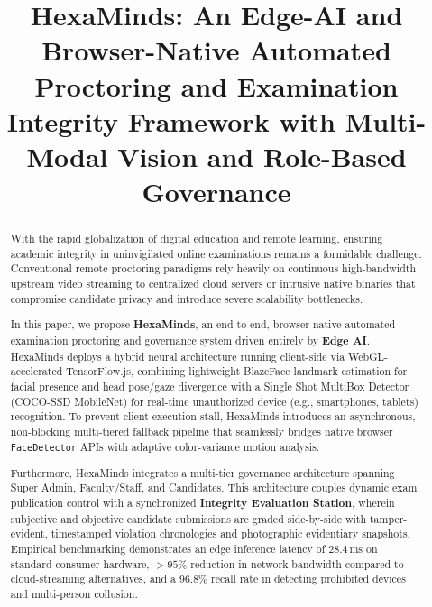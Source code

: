 \documentclass[conference]{IEEEtran}
\begin{document}
\title{HexaMinds: An Edge-AI and Browser-Native Automated Proctoring and Examination Integrity Framework with Multi-Modal Vision and Role-Based Governance}

\author{
\and
{}
}

\maketitle

\begin{abstract}
With the rapid globalization of digital education and remote learning, ensuring academic integrity in uninvigilated online examinations remains a formidable challenge. Conventional remote proctoring paradigms rely heavily on continuous high-bandwidth upstream video streaming to centralized cloud servers or intrusive native binaries that compromise candidate privacy and introduce severe scalability bottlenecks. 

In this paper, we propose \textbf{HexaMinds}, an end-to-end, browser-native automated examination proctoring and governance system driven entirely by \textbf{Edge AI}. HexaMinds deploys a hybrid neural architecture running client-side via WebGL-accelerated TensorFlow.js, combining lightweight BlazeFace landmark estimation for facial presence and head pose/gaze divergence with a Single Shot MultiBox Detector (COCO-SSD MobileNet) for real-time unauthorized device (e.g., smartphones, tablets) recognition. To prevent client execution stall, HexaMinds introduces an asynchronous, non-blocking multi-tiered fallback pipeline that seamlessly bridges native browser \texttt{FaceDetector} APIs with adaptive color-variance motion analysis. 

Furthermore, HexaMinds integrates a multi-tier governance architecture spanning Super Admin, Faculty/Staff, and Candidates. This architecture couples dynamic exam publication control with a synchronized \textbf{Integrity Evaluation Station}, wherein subjective and objective candidate submissions are graded side-by-side with tamper-evident, timestamped violation chronologies and photographic evidentiary snapshots. Empirical benchmarking demonstrates an edge inference latency of $28.4\,\text{ms}$ on standard consumer hardware, $>95\%$ reduction in network bandwidth compared to cloud-streaming alternatives, and a $96.8\%$ recall rate in detecting prohibited devices and multi-person collusion.
\end{abstract}
\end{document}
